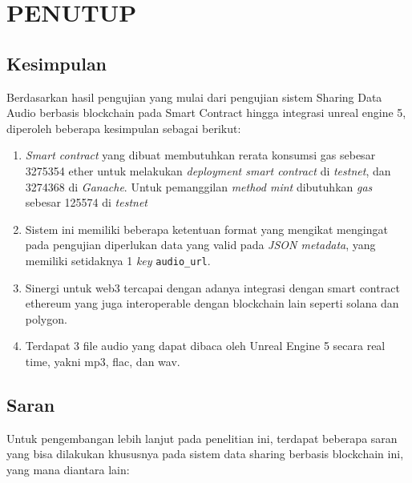 \chapter{PENUTUP}
\label{chap:penutup}


\section{Kesimpulan}
\label{sec:kesimpulan}

Berdasarkan hasil pengujian yang mulai dari pengujian sistem Sharing Data Audio berbasis blockchain pada Smart Contract hingga integrasi unreal engine 5, diperoleh beberapa kesimpulan sebagai berikut:

\begin{enumerate}[nolistsep]

  \item \emph{Smart contract} yang dibuat membutuhkan rerata konsumsi gas sebesar 3275354 ether untuk melakukan \emph{deployment smart contract} di \emph{testnet}, dan 3274368 di \emph{Ganache}. Untuk pemanggilan \emph{method mint} dibutuhkan \emph{gas} sebesar 125574 di \emph{testnet}

  \item Sistem ini memiliki beberapa ketentuan format yang mengikat mengingat pada pengujian diperlukan data yang valid pada \emph{JSON metadata}, yang memiliki setidaknya 1 \emph{key} \texttt{audio\_url}.

  \item Sinergi untuk web3 tercapai dengan adanya integrasi dengan smart contract ethereum yang juga interoperable dengan blockchain lain seperti solana dan polygon.

  \item Terdapat 3 file audio yang dapat dibaca oleh Unreal Engine 5 secara real time, yakni mp3, flac, dan wav.

\end{enumerate}

\section{Saran}
\label{chap:saran}

Untuk pengembangan lebih lanjut pada penelitian ini, terdapat beberapa saran yang bisa dilakukan khususnya pada sistem data sharing berbasis blockchain ini, yang mana diantara lain:

